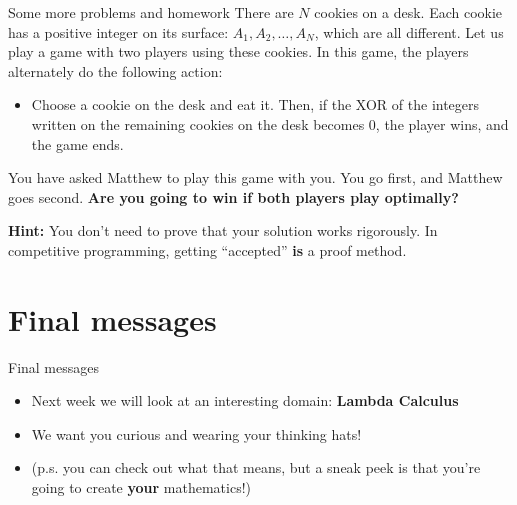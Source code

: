 \documentclass{beamer}
\begin{document}
\begin{frame}{Some more problems and homework}
    There are $N$ cookies on a desk. Each cookie has a positive integer on its surface: $A_1, A_2, \dots, A_N$, which are all different. Let us play a game with two players using these cookies. In this game, the players alternately do the following action:
    \begin{itemize}
        \item Choose a cookie on the desk and eat it. Then, if the XOR of the integers written on the remaining cookies on the desk becomes 0, the player wins, and the game ends.
    \end{itemize}
    \pause
    \vspace{0.5em}
    You have asked Matthew to play this game with you. You go first, and Matthew goes second. \textbf{Are you going to win if both players play optimally?}
    \pause
    \vspace{0.5em}

    \textbf{Hint:} You don’t need to prove that your solution works rigorously. In competitive programming, getting ``accepted'' \textbf{is} a proof method.
\end{frame}

\section{Final messages}

\begin{frame}{Final messages}
    \begin{itemize}
        \item Next week we will look at an interesting domain: \textbf{Lambda Calculus}
        \pause
        \item We want you curious and wearing your thinking hats!
        \pause
        \item (p.s. you can check out what that means, but a sneak peek is that you’re going to create \textbf{your} mathematics!)
    \end{itemize}
\end{frame}
\end{document}
